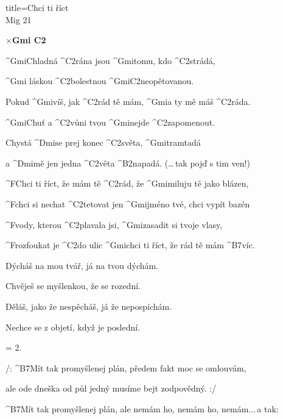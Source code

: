 \begin{song}{title=\predtitle\centering Chci ti říct \\\large Mig 21  \vspace*{-0.3cm}}  %
\begin{centerjustified}


$\times $\textbf{Gmi C2}

\sloka
	^{Gmi}Chladná ^{C2}rána jsou ^{Gmi}tomu, kdo ^{C2}strádá,

	^{Gmi\,\,}láskou ^{C2\z }bolestnou ^{Gmi\z C2}neopětovanou.

	Pokud ^{Gmi}víš, jak ^{C2}rád tě mám, ^{Gmi}a ty mě máš ^{C2}ráda.

	^{Gmi}Chuť a ^{C2}vůni tvou ^{Gmi}nejde ^{C2\z }zapomenout.

\sloka
	Chystá ^{Dmi}se prej konec ^{C2}světa, ^{Gmi}tramtadá

	a ^{Dmi}mě jen jedna ^{C2}věta ^{\z B2}napadá. (\dots\,tak pojď s tim ven!)

	^{F}Chci ti říct, že mám tě ^{C2}rád, že ^{Gmi}miluju tě jako blázen,

	^{F}chci si nechat ^{C2\z }tetovat jen ^{Gmi}jméno tvé, chci vypít bazén

	^{F}vody, kterou ^{C2\z }plavala jsi, ^{Gmi\z }zasadit si tvoje vlasy,

	^{F\z }rozfoukat je ^{C2}do ulic ^{Gmi}chci ti říct, že rád tě mám ^{B7}víc.

\sloka
	Dýcháš na mou tvář, já na tvou dýchám.

	Chvěješ se myšlenkou, že se rozední.

	Děláš, jako že nespěcháš, já že nepospíchám.

	Nechce se z objetí, když je poslední.

\sloka  = 2.



\sloka
	/: ^{B7}Mít tak promyšlenej plán, předem fakt moc se omlouvám, 

	ale ode dneška od půl jedný musíme bejt zodpovědný. :/

	^{B7}Mít tak promyšlenej plán, ale nemám ho, nemám ho, nemám\elipsa.\elipsa.\elipsa.\,a tak:



\end{centerjustified}
\setcounter{Slokočet}{0}
\end{song}
